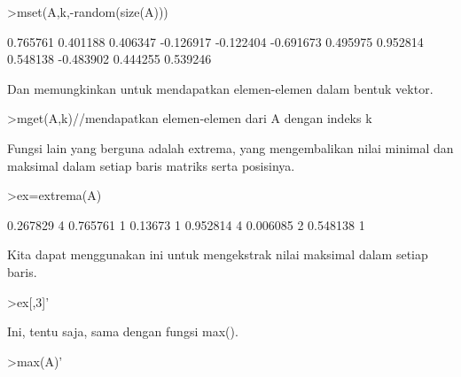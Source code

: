 \documentclass[12pt,arial,letterpaper]{book}
\begin{document}
\begin{eulercomment}
\begin{eulercomment}
\begin{eulercomment}
\end{eulercomment}
\begin{eulerprompt}
>mset(A,k,-random(size(A)))
\end{eulerprompt}
\begin{euleroutput}
       0.765761      0.401188      0.406347     -0.126917 
      -0.122404     -0.691673      0.495975      0.952814 
       0.548138     -0.483902      0.444255      0.539246 
\end{euleroutput}
\begin{eulercomment}
Dan memungkinkan untuk mendapatkan elemen-elemen dalam bentuk vektor.
\end{eulercomment}
\begin{eulerprompt}
>mget(A,k)//mendapatkan elemen-elemen dari A dengan indeks k
\end{eulerprompt}
\begin{euleroutput}
  [0.267829,  0.13673,  0.390567,  0.006085]
\end{euleroutput}
\begin{eulercomment}
Fungsi lain yang berguna adalah extrema, yang mengembalikan nilai
minimal dan maksimal dalam setiap baris matriks serta posisinya.
\end{eulercomment}
\begin{eulerprompt}
>ex=extrema(A)
\end{eulerprompt}
\begin{euleroutput}
       0.267829             4      0.765761             1 
        0.13673             1      0.952814             4 
       0.006085             2      0.548138             1 
\end{euleroutput}
\begin{eulercomment}
Kita dapat menggunakan ini untuk mengekstrak nilai maksimal dalam
setiap baris.
\end{eulercomment}
\begin{eulerprompt}
>ex[,3]'
\end{eulerprompt}
\begin{euleroutput}
  [0.765761,  0.952814,  0.548138]
\end{euleroutput}
\begin{eulercomment}
Ini, tentu saja, sama dengan fungsi max().
\end{eulercomment}
\begin{eulerprompt}
>max(A)'
\end{eulerprompt}
\begin{euleroutput}
  [0.765761,  0.952814,  0.548138]
\end{euleroutput}

\end{eulercomment}
\end{eulercomment}
\end{document}
